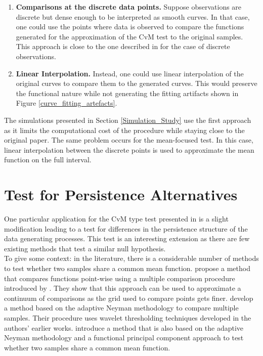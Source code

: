 \documentclass[12pt, a4paper]{article}
\theoremstyle{MAstyle} \newtheorem{assumption}{Assumption}[section]
\theoremstyle{MAstyle} \newtheorem{definition}{Definition}[section]
\theoremstyle{MAstyle} \newtheorem{theorem}{Theorem}[section]
\begin{document}
			\begin{enumerate}
				\item \textbf{Comparisons at the discrete data points.} Suppose observations are discrete but dense enough to be interpreted as smooth curves. In that case, one could use the points where data is observed to compare the functions generated for the approximation of the CvM test to the original samples. This approach is close to the one described in \cite{bugni_permutation_2021} for the case of discrete observations.
				\item \textbf{Linear Interpolation.} Instead, one could use linear interpolation of the original curves to compare them to the generated curves. This would preserve the functional nature while not generating the fitting artifacts shown in Figure \ref{curve_fitting_artefacts}.
			\end{enumerate}
			The simulations presented in Section \ref{Simulation_Study} use the first approach as it limits the computational cost of the procedure while staying close to the original paper. The same problem occurs for the mean-focused test. In this case, linear interpolation between the discrete points is used to approximate the mean function on the full interval.

	\section{Test for Persistence Alternatives}\label{variant}
		One particular application for the CvM type test presented in \cite{bugni_permutation_2021} is a slight modification leading to a test for differences in the persistence structure of the data generating processes. This test is an interesting extension as there are few existing methods that test a similar null hypothesis.\\
		
		To give some context: in the literature, there is a considerable number of methods to test whether two samples share a common mean function.
		\cite{cox_pointwise_2008} propose a method that compares functions point-wise using a multiple comparison procedure introduced by \cite{westfall_resampling-based_1993}. They show that this approach can be used to approximate a continuum of comparisons as the grid used to compare points gets finer.
		\cite{fan_test_1998} develop a method based on the adaptive Neyman methodology to compare multiple samples. Their procedure uses wavelet thresholding techniques developed in the authors' earlier works. 
		\cite{lee_two_2015} introduce a method that is also based on the adaptive Neyman methodology and a functional principal component approach to test whether two samples share a common mean function.
		
\end{document}
